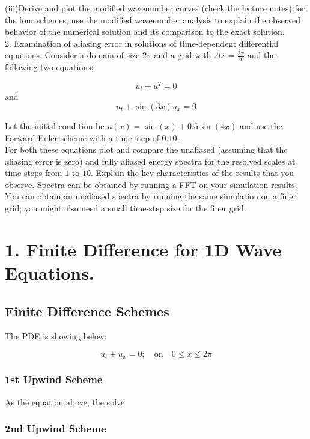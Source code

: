 \documentclass[12pt]{article}
\begin{document}
(iii)Derive and plot the modified wavenumber curves 
(check the lecture notes) for the four schemes; 
use the modified wavenumber analysis to explain the observed 
behavior of the numerical solution and its comparison to the 
exact solution.\\

2. Examination of aliasing error in solutions of 
time-dependent differential equations.
Consider a domain of size \(2\pi\) and a grid
 with \( \Delta x = \frac{2\pi}{20} \) and the following 
 two equations:

    $$u_t + u^2 = 0$$
and
    $$u_t + \sin(3x)u_x = 0$$

Let the initial condition be 
\( u(x) = \sin(x) + 0.5 \sin(4x) \) and use the 
Forward Euler scheme with a time step of \(0.10\).\\

For both these equations plot and compare the unaliased 
(assuming that the aliasing error is zero) and fully aliased 
energy spectra for the resolved scales at time steps from 
\(1\) to \(10\). Explain the key characteristics of the 
results that you observe. Spectra can be obtained by running 
a FFT on your simulation results.\\

You can obtain an unaliased spectra by running the same 
simulation on a finer grid; you might also need a small 
time-step size for the finer grid.


\section{1. Finite Difference for 1D Wave Equations.}

\subsection{Finite Difference Schemes}


The PDE is showing below:

\begin{equation}
    u_t + u_x = 0; \quad \text{on} \quad 0 \leq x \leq 2\pi
\end{equation}

\subsubsection{1st Upwind Scheme}
As the equation above, the solve

\subsubsection{2nd Upwind Scheme}
\end{document}

